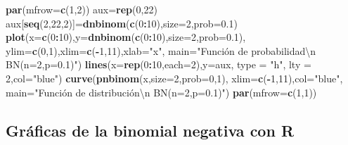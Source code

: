 \documentclass[]{book}
\newenvironment{Shaded}{\begin{snugshade}}{\end{snugshade}}
\newcommand{\CharTok}[1]{\textcolor[rgb]{0.31,0.60,0.02}{#1}}
\newcommand{\DataTypeTok}[1]{\textcolor[rgb]{0.13,0.29,0.53}{#1}}
\newcommand{\DecValTok}[1]{\textcolor[rgb]{0.00,0.00,0.81}{#1}}
\newcommand{\FloatTok}[1]{\textcolor[rgb]{0.00,0.00,0.81}{#1}}
\newcommand{\KeywordTok}[1]{\textcolor[rgb]{0.13,0.29,0.53}{\textbf{#1}}}
\newcommand{\NormalTok}[1]{#1}
\newcommand{\OperatorTok}[1]{\textcolor[rgb]{0.81,0.36,0.00}{\textbf{#1}}}
\newcommand{\StringTok}[1]{\textcolor[rgb]{0.31,0.60,0.02}{#1}}
\begin{document}
\begin{Shaded}
\begin{Highlighting}[]
\KeywordTok{par}\NormalTok{(}\DataTypeTok{mfrow=}\KeywordTok{c}\NormalTok{(}\DecValTok{1}\NormalTok{,}\DecValTok{2}\NormalTok{))}
\NormalTok{aux=}\KeywordTok{rep}\NormalTok{(}\DecValTok{0}\NormalTok{,}\DecValTok{22}\NormalTok{)}
\NormalTok{aux[}\KeywordTok{seq}\NormalTok{(}\DecValTok{2}\NormalTok{,}\DecValTok{22}\NormalTok{,}\DecValTok{2}\NormalTok{)]=}\KeywordTok{dnbinom}\NormalTok{(}\KeywordTok{c}\NormalTok{(}\DecValTok{0}\OperatorTok{:}\DecValTok{10}\NormalTok{),}\DataTypeTok{size=}\DecValTok{2}\NormalTok{,}\DataTypeTok{prob=}\FloatTok{0.1}\NormalTok{)}
\KeywordTok{plot}\NormalTok{(}\DataTypeTok{x=}\KeywordTok{c}\NormalTok{(}\DecValTok{0}\OperatorTok{:}\DecValTok{10}\NormalTok{),}\DataTypeTok{y=}\KeywordTok{dnbinom}\NormalTok{(}\KeywordTok{c}\NormalTok{(}\DecValTok{0}\OperatorTok{:}\DecValTok{10}\NormalTok{),}\DataTypeTok{size=}\DecValTok{2}\NormalTok{,}\DataTypeTok{prob=}\FloatTok{0.1}\NormalTok{),}
  \DataTypeTok{ylim=}\KeywordTok{c}\NormalTok{(}\DecValTok{0}\NormalTok{,}\DecValTok{1}\NormalTok{),}\DataTypeTok{xlim=}\KeywordTok{c}\NormalTok{(}\OperatorTok{-}\DecValTok{1}\NormalTok{,}\DecValTok{11}\NormalTok{),}\DataTypeTok{xlab=}\StringTok{"x"}\NormalTok{,}
  \DataTypeTok{main=}\StringTok{"Función de probabilidad}\CharTok{\textbackslash{}n}\StringTok{ BN(n=2,p=0.1)"}\NormalTok{)}
\KeywordTok{lines}\NormalTok{(}\DataTypeTok{x=}\KeywordTok{rep}\NormalTok{(}\DecValTok{0}\OperatorTok{:}\DecValTok{10}\NormalTok{,}\DataTypeTok{each=}\DecValTok{2}\NormalTok{),}\DataTypeTok{y=}\NormalTok{aux, }\DataTypeTok{type =} \StringTok{"h"}\NormalTok{, }\DataTypeTok{lty =} \DecValTok{2}\NormalTok{,}\DataTypeTok{col=}\StringTok{"blue"}\NormalTok{)}
\KeywordTok{curve}\NormalTok{(}\KeywordTok{pnbinom}\NormalTok{(x,}\DataTypeTok{size=}\DecValTok{2}\NormalTok{,}\DataTypeTok{prob=}\DecValTok{0}\NormalTok{,}\DecValTok{1}\NormalTok{),}
  \DataTypeTok{xlim=}\KeywordTok{c}\NormalTok{(}\OperatorTok{-}\DecValTok{1}\NormalTok{,}\DecValTok{11}\NormalTok{),}\DataTypeTok{col=}\StringTok{"blue"}\NormalTok{,}
  \DataTypeTok{main=}\StringTok{"Función de distribución\textbackslash{}n BN(n=2,p=0.1)"}\NormalTok{)}
\KeywordTok{par}\NormalTok{(}\DataTypeTok{mfrow=}\KeywordTok{c}\NormalTok{(}\DecValTok{1}\NormalTok{,}\DecValTok{1}\NormalTok{))}
\end{Highlighting}
\end{Shaded}

\hypertarget{gruxe1ficas-de-la-binomial-negativa-con-r-1}{%
\subsection{Gráficas de la binomial negativa con R}\label{gruxe1ficas-de-la-binomial-negativa-con-r-1}}
\end{document}

